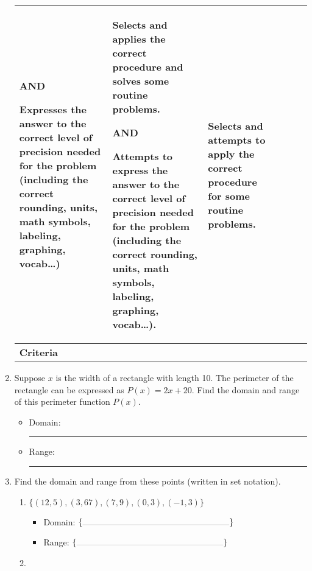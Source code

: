 \documentclass[twoside, 10pt]{article}
\begin{document}
\begin{enumerate}[leftmargin=*]
\begin{center}
{\begin{tabularx}{\textwidth}{|X|X|X|X|X|X|}
AND

Expresses the answer to the correct level of precision needed for the problem (including the correct rounding, units, math symbols, labeling, graphing, vocab…)
&Selects and applies the correct procedure and solves some routine problems.


AND

Attempts to express the answer to the correct level of precision needed for the problem (including the correct rounding, units, math symbols, labeling, graphing, vocab…).
&Selects and attempts to apply the correct procedure for some routine problems.\\
\hline
\bf Criteria&\multicolumn{5}{l|}{\parbox[c][4em]{.8\textwidth}{}}\\
\hline
\end{tabularx}
}
\end{center}
\endgroup

\item Suppose $x$ is the width of a rectangle with length 10. The perimeter of the rectangle can be expressed as $P(x) = 2x + 20$. Find the domain and range of this perimeter function $P(x)$.
\vspace{1em}
\begin{itemize}
\item
Domain: \rule{0.5\textwidth}{.1pt}
\vspace{1em}
\item
Range: \rule{0.5\textwidth}{.1pt}
\end{itemize}
\item Find the domain and range from these points (written in set notation).
\begin{enumerate}
\item $\{(12,5), (3,67), (7,9), (0,3), (-1, 3)\}$
\vspace{1em}
\begin{itemize}
\item
Domain: $\{\rule{0.5\textwidth}{.1pt}\}$
\vspace{1em}
\item
Range: $\{\rule{0.5\textwidth}{.1pt}\}$ 
\end{itemize}
\item\ 


\end{enumerate}
\end{enumerate}
\end{document}
